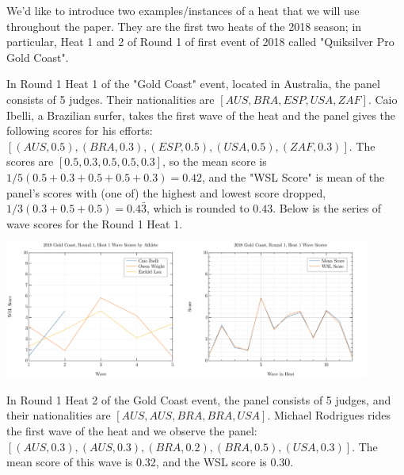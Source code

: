 \documentclass{article}
\theoremstyle{definition}
\begin{document}
We'd like to introduce two examples/instances of a heat that we will use throughout the paper. They are the first two heats of the 2018 season; in particular, Heat 1 and 2 of Round 1 of first event of 2018 called "Quiksilver Pro Gold Coast".

In Round 1 Heat 1 of the "Gold Coast" event, located in Australia, the panel consists of 5 judges. Their nationalities are $[AUS,BRA,ESP, USA,ZAF]$. Caio Ibelli, a Brazilian surfer, takes the first wave of the heat and the panel gives the following scores for his efforts: $ [(AUS,0.5), (BRA,0.3),(ESP,0.5),(USA,0.5),(ZAF,0.3)]$. The scores are $[0.5,0.3,0.5,0.5,0.3]$, so the mean score is $1/5(0.5+0.3+0.5+0.5+0.3) = 0.42$, and the "WSL Score" is mean of the panel's scores with (one of) the highest and lowest score dropped, $1/3(0.3+0.5+0.5) = 0.4\bar{3}$, which is rounded to $0.43$. Below is the series of wave scores for the Round 1 Heat 1.

\includegraphics[width=6cm]{./src/visuals/2018GCR1/WaveScoresByAthH1.png}\includegraphics[width=6cm]{./src/visuals/2018GCR1/WaveScoresH1.png}


In Round 1 Heat 2 of the Gold Coast event, the panel consists of 5 judges, and their nationalities are $[AUS,AUS,BRA,BRA,USA]$. Michael Rodrigues rides the first wave of the heat and we observe the panel: $[(AUS,0.3),(AUS,0.3),(BRA,0.2),(BRA,0.5),(USA,0.3)]$. The mean score of this wave is 0.32, and the WSL score is 0.30.
\end{document}
